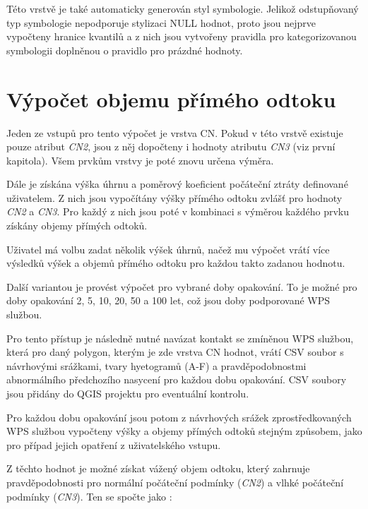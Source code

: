 \documentclass[a4paper,oneside,12pt]{book}
\begin{document}
\hspace{10mm}Této vrstvě je také automaticky generován styl symbologie. Jelikož odstupňovaný typ symbologie nepodporuje stylizaci NULL hodnot, proto jsou nejprve vypočteny hranice kvantilů a z nich jsou vytvořeny pravidla pro kategorizovanou symbologii doplněnou o pravidlo pro prázdné hodnoty.

\section{Výpočet objemu přímého odtoku} \label{runoff}

\hspace{10mm}Jeden ze vstupů pro tento výpočet je vrstva CN. Pokud v této vrstvě existuje pouze atribut \textit{CN2}, jsou z něj dopočteny i hodnoty atributu \textit{CN3} (viz první kapitola). Všem prvkům vrstvy je poté znovu určena výměra.

\hspace{10mm} Dále je získána výška úhrnu a poměrový koeficient počáteční ztráty definované uživatelem. Z nich jsou vypočítány výšky přímého odtoku zvlášť pro hodnoty \textit{CN2} a \textit{CN3}. Pro každý z nich jsou poté v kombinaci s výměrou každého prvku získány objemy přímých odtoků.

\hspace{10mm} Uživatel má volbu zadat několik výšek úhrnů, načež mu výpočet vrátí více výsledků výšek a objemů přímého odtoku pro každou takto zadanou hodnotu.

\hspace{10mm} Další variantou je provést výpočet pro vybrané doby opakování. To je možné pro doby opakování 2, 5, 10, 20, 50 a 100 let, což jsou doby podporované WPS službou. 

\hspace{10mm}Pro tento přístup je následně nutné navázat kontakt se zmíněnou WPS službou, která pro daný polygon, kterým je zde vrstva CN hodnot, vrátí CSV soubor s návrhovými srážkami, tvary hyetogramů (A-F) a pravděpodobnostmi abnormálního předchozího nasycení pro každou dobu opakování. CSV soubory jsou přidány do QGIS projektu pro eventuální kontrolu. 

\hspace{10mm} Pro každou dobu opakování jsou potom z návrhových srážek zprostředkovaných WPS službou vypočteny výšky a objemy přímých odtoků stejným způsobem, jako pro případ jejich opatření z uživatelského vstupu.

\hspace{10mm}Z těchto hodnot je možné získat vážený objem odtoku, který zahrnuje pravděpodobnosti pro normální počáteční podmínky (\textit{CN2}) a vlhké počáteční podmínky (\textit{CN3}). Ten se spočte jako \cite{MNYDGwleJOjKLRU2}:
\end{document}
